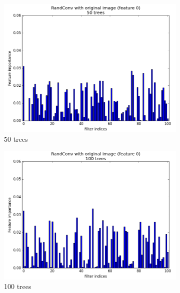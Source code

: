 \documentclass[a4paper]{report}
\begin{document}
\begin{figure}
\begin{subfigure}{.5\textwidth}
				\includegraphics[width=1.\linewidth]{images/FI50trees.png}
				\caption{\label{fig:FI50trees}50 trees}
			\end{subfigure}%
			\begin{subfigure}{.5\textwidth}
				\centering
				\includegraphics[width=1.\linewidth]{images/FI100trees.png}
				\caption{\label{fig:FI100trees}100 trees}
			\end{subfigure}
			\begin{subfigure}{.5\textwidth}
				\centering

\end{subfigure}
\end{figure}
\end{document}
